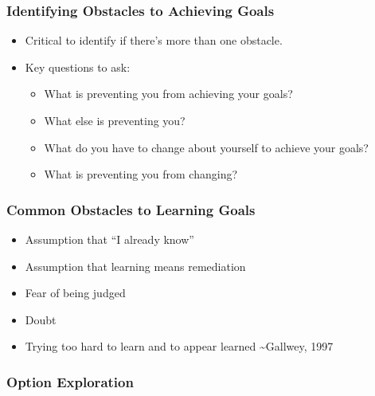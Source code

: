 \documentclass[
]{book}
\providecommand{\tightlist}{%
  \setlength{\itemsep}{0pt}\setlength{\parskip}{0pt}}
\begin{document}
\hypertarget{identifying-obstacles-to-achieving-goals}{%
\subsubsection*{Identifying Obstacles to Achieving Goals}\label{identifying-obstacles-to-achieving-goals}}

\begin{itemize}
\tightlist
\item
  Critical to identify if there's more than one obstacle.
\item
  Key questions to ask:

  \begin{itemize}
  \tightlist
  \item
    What is preventing you from achieving your goals?
  \item
    What else is preventing you?
  \item
    What do you have to change about yourself to achieve your goals?
  \item
    What is preventing you from changing?
  \end{itemize}
\end{itemize}

\hypertarget{common-obstacles-to-learning-goals}{%
\subsubsection*{Common Obstacles to Learning Goals}\label{common-obstacles-to-learning-goals}}

\begin{itemize}
\tightlist
\item
  Assumption that ``I already know''
\item
  Assumption that learning means remediation
\item
  Fear of being judged
\item
  Doubt
\item
  Trying too hard to learn and to appear learned
  \textasciitilde Gallwey, 1997
\end{itemize}

\hypertarget{option-exploration}{%
\subsubsection*{Option Exploration}\label{option-exploration}}
\end{document}
